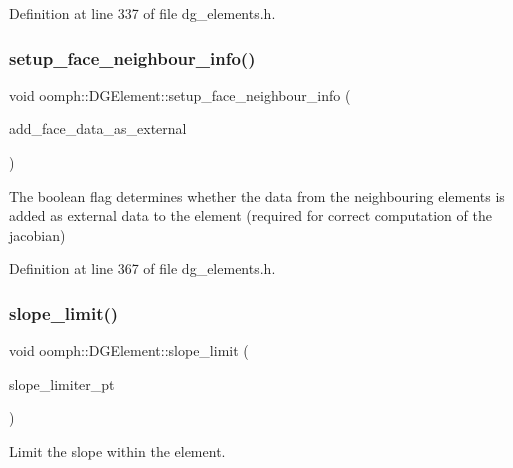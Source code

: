 Definition at line 337 of file dg\+\_\+elements.\+h.

\mbox{\label{classoomph_1_1DGElement_a318f2799a91b674c9420e4fc1da5c055}} 
\subsubsection{\texorpdfstring{setup\+\_\+face\+\_\+neighbour\+\_\+info()}{setup\_face\_neighbour\_info()}}
{\footnotesize\ttfamily void oomph\+::\+D\+G\+Element\+::setup\+\_\+face\+\_\+neighbour\+\_\+info (\begin{DoxyParamCaption}\item[{const bool \&}]{add\+\_\+face\+\_\+data\+\_\+as\+\_\+external }\end{DoxyParamCaption})\hspace{0.3cm}{\ttfamily [inline]}}

The boolean flag determines whether the data from the neighbouring elements is added as external data to the element (required for correct computation of the jacobian) 

Definition at line 367 of file dg\+\_\+elements.\+h.

\mbox{\label{classoomph_1_1DGElement_a69834c27193675dfa9e9d03413ac9d7e}} 
\subsubsection{\texorpdfstring{slope\+\_\+limit()}{slope\_limit()}}
{\footnotesize\ttfamily void oomph\+::\+D\+G\+Element\+::slope\+\_\+limit (\begin{DoxyParamCaption}\item[{\hyperlink{classoomph_1_1SlopeLimiter}{Slope\+Limiter} $\ast$const \&}]{slope\+\_\+limiter\+\_\+pt }\end{DoxyParamCaption})}



Limit the slope within the element. 

